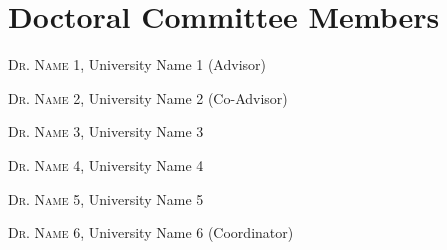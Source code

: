 
\chapter*{Doctoral Committee Members}

\noindent \textsc{Dr. Name 1}, University Name 1 (Advisor) 

\noindent \textsc{Dr. Name 2}, University Name 2 (Co-Advisor) 

\noindent \textsc{Dr. Name 3}, University Name 3  

\noindent \textsc{Dr. Name 4}, University Name 4  

\noindent \textsc{Dr. Name 5}, University Name 5  

\noindent \textsc{Dr. Name 6}, University Name 6 (Coordinator) 